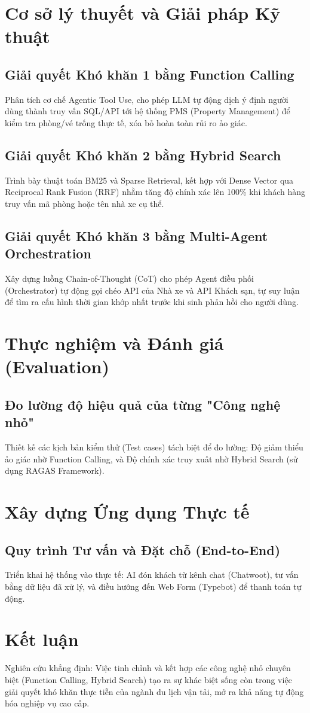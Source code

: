 \documentclass[12pt,a4paper]{report}
\begin{document}
\chapter{Cơ sở lý thuyết và Giải pháp Kỹ thuật}
\section{Giải quyết Khó khăn 1 bằng Function Calling}
Phân tích cơ chế Agentic Tool Use, cho phép LLM tự động dịch ý định người dùng thành truy vấn SQL/API tới hệ thống PMS (Property Management) để kiểm tra phòng/vé trống thực tế, xóa bỏ hoàn toàn rủi ro ảo giác.

\section{Giải quyết Khó khăn 2 bằng Hybrid Search}
Trình bày thuật toán BM25 và Sparse Retrieval, kết hợp với Dense Vector qua Reciprocal Rank Fusion (RRF) nhằm tăng độ chính xác lên 100\% khi khách hàng truy vấn mã phòng hoặc tên nhà xe cụ thể.

\section{Giải quyết Khó khăn 3 bằng Multi-Agent Orchestration}
Xây dựng luồng Chain-of-Thought (CoT) cho phép Agent điều phối (Orchestrator) tự động gọi chéo API của Nhà xe và API Khách sạn, tự suy luận để tìm ra cấu hình thời gian khớp nhất trước khi sinh phản hồi cho người dùng.

\chapter{Thực nghiệm và Đánh giá (Evaluation)}
\section{Đo lường độ hiệu quả của từng "Công nghệ nhỏ"}
Thiết kế các kịch bản kiểm thử (Test cases) tách biệt để đo lường: Độ giảm thiểu ảo giác nhờ Function Calling, và Độ chính xác truy xuất nhờ Hybrid Search (sử dụng RAGAS Framework).

\chapter{Xây dựng Ứng dụng Thực tế}
\section{Quy trình Tư vấn và Đặt chỗ (End-to-End)}
Triển khai hệ thống vào thực tế: AI đón khách từ kênh chat (Chatwoot), tư vấn bằng dữ liệu đã xử lý, và điều hướng đến Web Form (Typebot) để thanh toán tự động.

\chapter{Kết luận}
Nghiên cứu khẳng định: Việc tinh chỉnh và kết hợp các công nghệ nhỏ chuyên biệt (Function Calling, Hybrid Search) tạo ra sự khác biệt sống còn trong việc giải quyết khó khăn thực tiễn của ngành du lịch vận tải, mở ra khả năng tự động hóa nghiệp vụ cao cấp.
\end{document}
